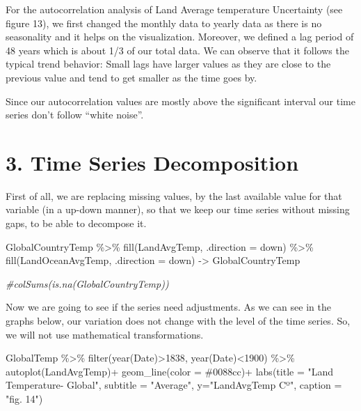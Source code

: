 \documentclass[
]{article}
\newenvironment{Shaded}{\begin{snugshade}}{\end{snugshade}}
\newcommand{\AttributeTok}[1]{\textcolor[rgb]{0.77,0.63,0.00}{#1}}
\newcommand{\CommentTok}[1]{\textcolor[rgb]{0.56,0.35,0.01}{\textit{#1}}}
\newcommand{\DecValTok}[1]{\textcolor[rgb]{0.00,0.00,0.81}{#1}}
\newcommand{\FunctionTok}[1]{\textcolor[rgb]{0.00,0.00,0.00}{#1}}
\newcommand{\NormalTok}[1]{#1}
\newcommand{\OtherTok}[1]{\textcolor[rgb]{0.56,0.35,0.01}{#1}}
\newcommand{\SpecialCharTok}[1]{\textcolor[rgb]{0.00,0.00,0.00}{#1}}
\newcommand{\StringTok}[1]{\textcolor[rgb]{0.31,0.60,0.02}{#1}}
\begin{document}
For the autocorrelation analysis of Land Average temperature Uncertainty
(see figure 13), we first changed the monthly data to yearly data as
there is no seasonality and it helps on the visualization. Moreover, we
defined a lag period of 48 years which is about 1/3 of our total data.
We can observe that it follows the typical trend behavior: Small lags
have larger values as they are close to the previous value and tend to
get smaller as the time goes by.

Since our autocorrelation values are mostly above the significant
interval our time series don't follow ``white noise''.

\hypertarget{time-series-decomposition}{%
\section{3. Time Series Decomposition}\label{time-series-decomposition}}

First of all, we are replacing missing values, by the last available
value for that variable (in a up-down manner), so that we keep our time
series without missing gaps, to be able to decompose it.

\begin{Shaded}
\begin{Highlighting}[]
\NormalTok{GlobalCountryTemp }\SpecialCharTok{\%\textgreater{}\%}
  \FunctionTok{fill}\NormalTok{(LandAvgTemp, }\AttributeTok{.direction =} \StringTok{\textquotesingle{}down\textquotesingle{}}\NormalTok{) }\SpecialCharTok{\%\textgreater{}\%}
  \FunctionTok{fill}\NormalTok{(LandOceanAvgTemp, }\AttributeTok{.direction =} \StringTok{\textquotesingle{}down\textquotesingle{}}\NormalTok{) }\OtherTok{{-}\textgreater{}}\NormalTok{ GlobalCountryTemp }
  
\CommentTok{\#colSums(is.na(GlobalCountryTemp))}
\end{Highlighting}
\end{Shaded}

Now we are going to see if the series need adjustments. As we can see in
the graphs below, our variation does not change with the level of the
time series. So, we will not use mathematical transformations.

\begin{Shaded}
\begin{Highlighting}[]
\NormalTok{GlobalTemp }\SpecialCharTok{\%\textgreater{}\%}
  \FunctionTok{filter}\NormalTok{(}\FunctionTok{year}\NormalTok{(Date)}\SpecialCharTok{\textgreater{}}\DecValTok{1838}\NormalTok{, }\FunctionTok{year}\NormalTok{(Date)}\SpecialCharTok{\textless{}}\DecValTok{1900}\NormalTok{) }\SpecialCharTok{\%\textgreater{}\%}
  \FunctionTok{autoplot}\NormalTok{(LandAvgTemp)}\SpecialCharTok{+}
  \FunctionTok{geom\_line}\NormalTok{(}\AttributeTok{color =} \StringTok{\textquotesingle{}\#0088cc\textquotesingle{}}\NormalTok{)}\SpecialCharTok{+}
  \FunctionTok{labs}\NormalTok{(}\AttributeTok{title =} \StringTok{"Land Temperature{-} Global"}\NormalTok{,}
       \AttributeTok{subtitle =} \StringTok{"Average"}\NormalTok{,}
       \AttributeTok{y=}\StringTok{"LandAvgTemp Cº"}\NormalTok{, }\AttributeTok{caption =} \StringTok{"fig. 14"}\NormalTok{)}
\end{Highlighting}
\end{Shaded}
\end{document}

